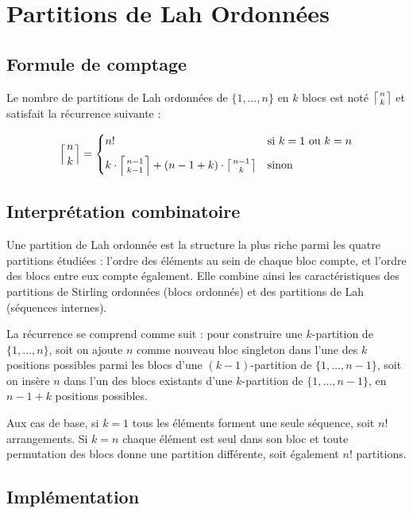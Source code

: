 \documentclass[12pt, a4paper]{report}
\begin{document}
\section{Partitions de Lah Ordonn\'ees}

\subsection{Formule de comptage}

Le nombre de partitions de Lah ordonn\'ees de $\{1, \ldots, n\}$ en $k$ blocs est
not\'e $\left\lceil n \atop k \right\rceil$ et satisfait la r\'ecurrence suivante :

\[
  \left\lceil n \atop k \right\rceil =
  \begin{cases}
    n! & \text{si } k = 1 \text{ ou } k = n \\[6pt]
    k \cdot \left\lceil n-1 \atop k-1 \right\rceil + (n - 1 + k) \cdot
    \left\lceil n-1 \atop k \right\rceil & \text{sinon}
  \end{cases}
\]

\subsection{Interpr\'etation combinatoire}

Une partition de Lah ordonn\'ee est la structure la plus riche parmi les quatre
partitions \'etudi\'ees : l'ordre des \'el\'ements au sein de chaque bloc compte,
et l'ordre des blocs entre eux compte \'egalement. Elle combine ainsi les
caract\'eristiques des partitions de Stirling ordonn\'ees (blocs ordonn\'es) et
des partitions de Lah (s\'equences internes).

La r\'ecurrence se comprend comme suit : pour construire une $k$-partition de
$\{1, \ldots, n\}$, soit on ajoute $n$ comme nouveau bloc singleton dans l'une
des $k$ positions possibles parmi les blocs d'une $(k-1)$-partition de
$\{1, \ldots, n-1\}$, soit on ins\`ere $n$ dans l'un des blocs existants d'une
$k$-partition de $\{1, \ldots, n-1\}$, en $n - 1 + k$ positions possibles.

Aux cas de base, si $k = 1$ tous les \'el\'ements forment une seule s\'equence,
soit $n!$ arrangements. Si $k = n$ chaque \'el\'ement est seul dans son bloc et
toute permutation des blocs donne une partition diff\'erente, soit \'egalement $n!$
partitions.

\subsection{Impl\'ementation}
\end{document}
